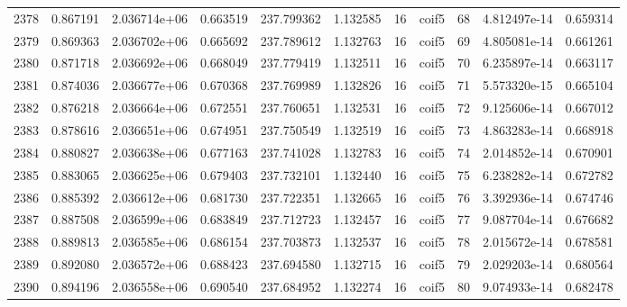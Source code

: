\begin{tabular}{lrrrrrrlrrr}
2378 &    0.867191 &        2.036714e+06 &  0.663519 &              237.799362 &    1.132585 &      16 &        coif5 &     68 &   4.812497e-14 &      0.659314 \\
2379 &    0.869363 &        2.036702e+06 &  0.665692 &              237.789612 &    1.132763 &      16 &        coif5 &     69 &   4.805081e-14 &      0.661261 \\
2380 &    0.871718 &        2.036692e+06 &  0.668049 &              237.779419 &    1.132511 &      16 &        coif5 &     70 &   6.235897e-14 &      0.663117 \\
2381 &    0.874036 &        2.036677e+06 &  0.670368 &              237.769989 &    1.132826 &      16 &        coif5 &     71 &   5.573320e-15 &      0.665104 \\
2382 &    0.876218 &        2.036664e+06 &  0.672551 &              237.760651 &    1.132531 &      16 &        coif5 &     72 &   9.125606e-14 &      0.667012 \\
2383 &    0.878616 &        2.036651e+06 &  0.674951 &              237.750549 &    1.132519 &      16 &        coif5 &     73 &   4.863283e-14 &      0.668918 \\
2384 &    0.880827 &        2.036638e+06 &  0.677163 &              237.741028 &    1.132783 &      16 &        coif5 &     74 &   2.014852e-14 &      0.670901 \\
2385 &    0.883065 &        2.036625e+06 &  0.679403 &              237.732101 &    1.132440 &      16 &        coif5 &     75 &   6.238282e-14 &      0.672782 \\
2386 &    0.885392 &        2.036612e+06 &  0.681730 &              237.722351 &    1.132665 &      16 &        coif5 &     76 &   3.392936e-14 &      0.674746 \\
2387 &    0.887508 &        2.036599e+06 &  0.683849 &              237.712723 &    1.132457 &      16 &        coif5 &     77 &   9.087704e-14 &      0.676682 \\
2388 &    0.889813 &        2.036585e+06 &  0.686154 &              237.703873 &    1.132537 &      16 &        coif5 &     78 &   2.015672e-14 &      0.678581 \\
2389 &    0.892080 &        2.036572e+06 &  0.688423 &              237.694580 &    1.132715 &      16 &        coif5 &     79 &   2.029203e-14 &      0.680564 \\
2390 &    0.894196 &        2.036558e+06 &  0.690540 &              237.684952 &    1.132274 &      16 &        coif5 &     80 &   9.074933e-14 &      0.682478 \\

\end{tabular}

